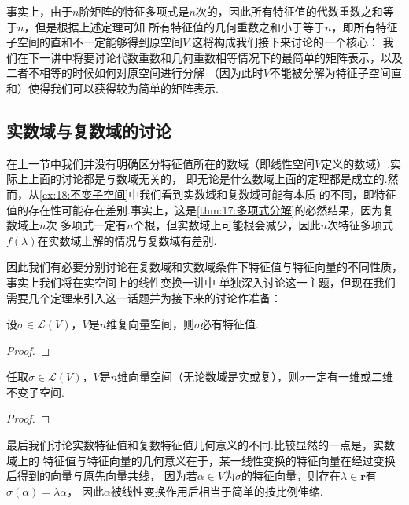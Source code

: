 事实上，由于$n$阶矩阵的特征多项式是$n$次的，因此所有特征值的代数重数之和等于$n$，但是根据上述定理可知
所有特征值的几何重数之和小于等于$n$，即所有特征子空间的直和不一定能够得到原空间$V$.这将构成我们接下来讨论的一个核心：
我们在下一讲中将要讨论代数重数和几何重数相等情况下的最简单的矩阵表示，以及二者不相等的时候如何对原空间进行分解
（因为此时$V$不能被分解为特征子空间直和）使得我们可以获得较为简单的矩阵表示.

\subsection{实数域与复数域的讨论}
在上一节中我们并没有明确区分特征值所在的数域（即线性空间$V$定义的数域）.实际上上面的讨论都是与数域无关的，
即无论是什么数域上面的定理都是成立的.然而，从\autoref{ex:18:不变子空间}中我们看到实数域和复数域可能有本质
的不同，即特征值的存在性可能存在差别.事实上，这是\autoref{thm:17:多项式分解}的必然结果，因为复数域上$n$次
多项式一定有$n$个根，但实数域上可能根会减少，因此$n$次特征多项式$f(\lambda)$在实数域上解的情况与复数域有差别.

因此我们有必要分别讨论在复数域和实数域条件下特征值与特征向量的不同性质，事实上我们将在实空间上的线性变换一讲中
单独深入讨论这一主题，但现在我们需要几个定理来引入这一话题并为接下来的讨论作准备：
\begin{theorem}\label{thm:18:复数域上的特征值}
    设$\sigma\in \mathcal{L}(V)$，$V$是$n$维复向量空间，则$\sigma$必有特征值.
\end{theorem}
\begin{proof}
    
\end{proof}

\begin{theorem}\label{thm:18:特征值与不变子空间}
    任取$\sigma\in \mathcal{L}(V)$，$V$是$n$维向量空间（无论数域是实或复），则$\sigma$一定有一维或二维不变子空间.
\end{theorem}
\begin{proof}
    
\end{proof}

最后我们讨论实数特征值和复数特征值几何意义的不同.比较显然的一点是，实数域上的
特征值与特征向量的几何意义在于，某一线性变换的特征向量在经过变换后得到的向量与原先向量共线，
因为若$\alpha\in V$为$\sigma$的特征向量，则存在$\lambda\in\mathbf{r}$有$\sigma(\alpha)=\lambda\alpha$，
因此$\alpha$被线性变换作用后相当于简单的按比例伸缩.

